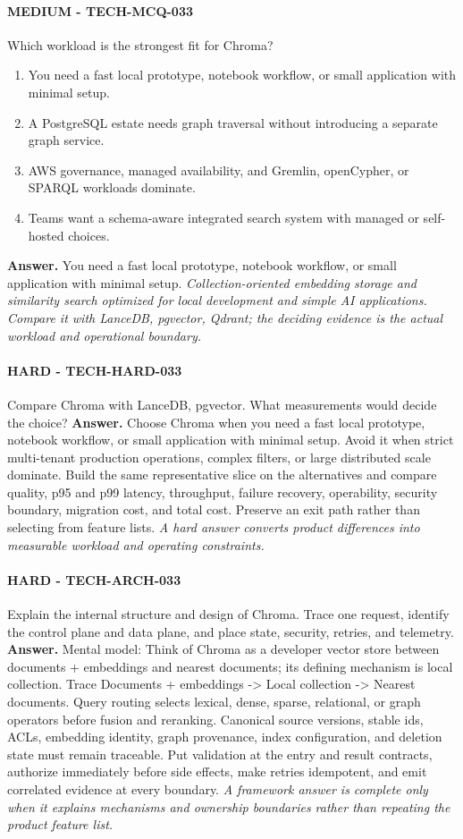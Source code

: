 \paragraph{MEDIUM - TECH-MCQ-033} Which workload is the strongest fit for Chroma?
\begin{enumerate}[label=\Alph*.]
\item You need a fast local prototype, notebook workflow, or small application with minimal setup.
\item A PostgreSQL estate needs graph traversal without introducing a separate graph service.
\item AWS governance, managed availability, and Gremlin, openCypher, or SPARQL workloads dominate.
\item Teams want a schema-aware integrated search system with managed or self-hosted choices.
\end{enumerate}
\textbf{Answer.} You need a fast local prototype, notebook workflow, or small application with minimal setup.
\textit{Collection-oriented embedding storage and similarity search optimized for local development and simple AI applications. Compare it with LanceDB, pgvector, Qdrant; the deciding evidence is the actual workload and operational boundary.}
\paragraph{HARD - TECH-HARD-033} Compare Chroma with LanceDB, pgvector. What measurements would decide the choice?
\textbf{Answer.} Choose Chroma when you need a fast local prototype, notebook workflow, or small application with minimal setup. Avoid it when strict multi-tenant production operations, complex filters, or large distributed scale dominate. Build the same representative slice on the alternatives and compare quality, p95 and p99 latency, throughput, failure recovery, operability, security boundary, migration cost, and total cost. Preserve an exit path rather than selecting from feature lists.
\textit{A hard answer converts product differences into measurable workload and operating constraints.}
\paragraph{HARD - TECH-ARCH-033} Explain the internal structure and design of Chroma. Trace one request, identify the control plane and data plane, and place state, security, retries, and telemetry.
\textbf{Answer.} Mental model: Think of Chroma as a developer vector store between documents + embeddings and nearest documents; its defining mechanism is local collection. Trace Documents + embeddings -> Local collection -> Nearest documents. Query routing selects lexical, dense, sparse, relational, or graph operators before fusion and reranking. Canonical source versions, stable ids, ACLs, embedding identity, graph provenance, index configuration, and deletion state must remain traceable. Put validation at the entry and result contracts, authorize immediately before side effects, make retries idempotent, and emit correlated evidence at every boundary.
\textit{A framework answer is complete only when it explains mechanisms and ownership boundaries rather than repeating the product feature list.}

